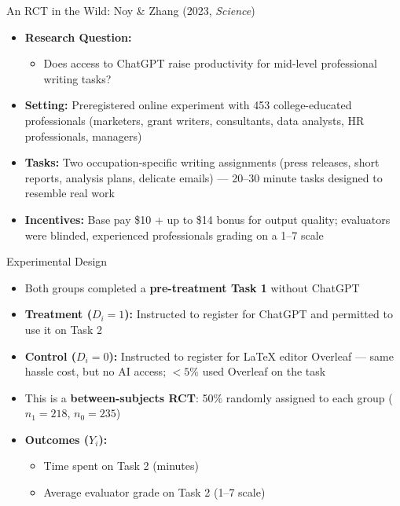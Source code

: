 \documentclass[hyperref={pdfpagelabels=false}]{beamer}
\begin{document}
	\begin{frame}{An RCT in the Wild: Noy \& Zhang (2023, \textit{Science})}
		\begin{itemize}
			\item \textbf{Research Question:}
			\vspace{0.2cm}
			\begin{itemize}
				\item Does access to ChatGPT raise productivity for mid-level professional writing tasks?
			\end{itemize}
			\vspace{0.3cm}
			\item \textbf{Setting:} Preregistered online experiment with 453 college-educated professionals (marketers, grant writers, consultants, data analysts, HR professionals, managers)
			\vspace{0.3cm}
			\item \textbf{Tasks:} Two occupation-specific writing assignments (press releases, short reports, analysis plans, delicate emails) --- 20--30 minute tasks designed to resemble real work
			\vspace{0.3cm}
			\item \textbf{Incentives:} Base pay \$10 + up to \$14 bonus for output quality; evaluators were blinded, experienced professionals grading on a 1--7 scale
		\end{itemize}
	\end{frame}
	
	\begin{frame}{Experimental Design}
		\begin{itemize}
			\item Both groups completed a \textbf{pre-treatment Task 1} without ChatGPT
			\vspace{0.3cm}
			\item \textbf{Treatment ($D_i = 1$):} Instructed to register for ChatGPT and permitted to use it on Task 2
			\vspace{0.3cm}
			\item \textbf{Control ($D_i = 0$):} Instructed to register for LaTeX editor Overleaf --- same hassle cost, but no AI access; $<5\%$ used Overleaf on the task
			\vspace{0.4cm}
			\item This is a \textbf{between-subjects RCT}: 50\% randomly assigned to each group ($n_1 = 218$, $n_0 = 235$)
			\vspace{0.3cm}
			\item \textbf{Outcomes ($Y_i$):}
			\vspace{0.2cm}
			\begin{itemize}
				\item Time spent on Task 2 (minutes)
				\vspace{0.1cm}
				\item Average evaluator grade on Task 2 (1--7 scale)
			\end{itemize}
		\end{itemize}
	\end{frame}
	
\end{document}
